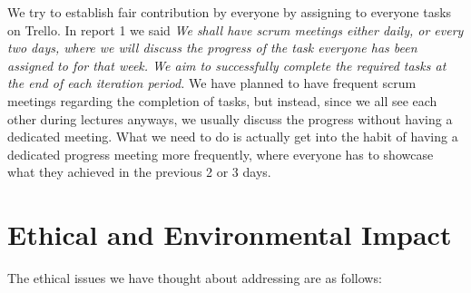 \documentclass[a4paper,12pt]{article}
\begin{document}

	We try to establish fair contribution by everyone by assigning to everyone tasks on Trello. In report 1 we said \emph{We shall have scrum meetings either daily, or every two days, where we will discuss the progress of the task everyone has been assigned to for that week. We aim to successfully complete the required tasks at the end of each iteration period.} We have planned to have frequent scrum meetings regarding the completion of tasks, but instead, since we all see each other during lectures anyways, we usually discuss the progress without having a dedicated meeting. What we need to do is actually get into the habit of having a dedicated progress meeting more frequently, where everyone has to showcase what they achieved in the previous 2 or 3 days.
	
	\section{Ethical and Environmental Impact}	
	
	The ethical issues we have thought about addressing are as follows:
	
\end{document}
